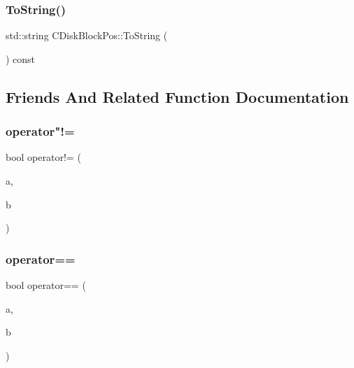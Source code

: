 \mbox{\label{struct_c_disk_block_pos_aec119689268c0dc9c2f1e3b25fd859ad}} 
\subsubsection{\texorpdfstring{To\+String()}{ToString()}}
{\footnotesize\ttfamily std\+::string C\+Disk\+Block\+Pos\+::\+To\+String (\begin{DoxyParamCaption}{ }\end{DoxyParamCaption}) const\hspace{0.3cm}{\ttfamily [inline]}}



\subsection{Friends And Related Function Documentation}
\mbox{\label{struct_c_disk_block_pos_af77481af6cf1d32788ba67c29cc061b5}} 
\subsubsection{\texorpdfstring{operator"!=}{operator!=}}
{\footnotesize\ttfamily bool operator!= (\begin{DoxyParamCaption}\item[{const \mbox{\hyperlink{struct_c_disk_block_pos}{C\+Disk\+Block\+Pos}} \&}]{a,  }\item[{const \mbox{\hyperlink{struct_c_disk_block_pos}{C\+Disk\+Block\+Pos}} \&}]{b }\end{DoxyParamCaption})\hspace{0.3cm}{\ttfamily [friend]}}

\mbox{\label{struct_c_disk_block_pos_a04787eb60da48b80e0f7fb402c6896fe}} 
\subsubsection{\texorpdfstring{operator==}{operator==}}
{\footnotesize\ttfamily bool operator== (\begin{DoxyParamCaption}\item[{const \mbox{\hyperlink{struct_c_disk_block_pos}{C\+Disk\+Block\+Pos}} \&}]{a,  }\item[{const \mbox{\hyperlink{struct_c_disk_block_pos}{C\+Disk\+Block\+Pos}} \&}]{b }\end{DoxyParamCaption})\hspace{0.3cm}{\ttfamily [friend]}}



